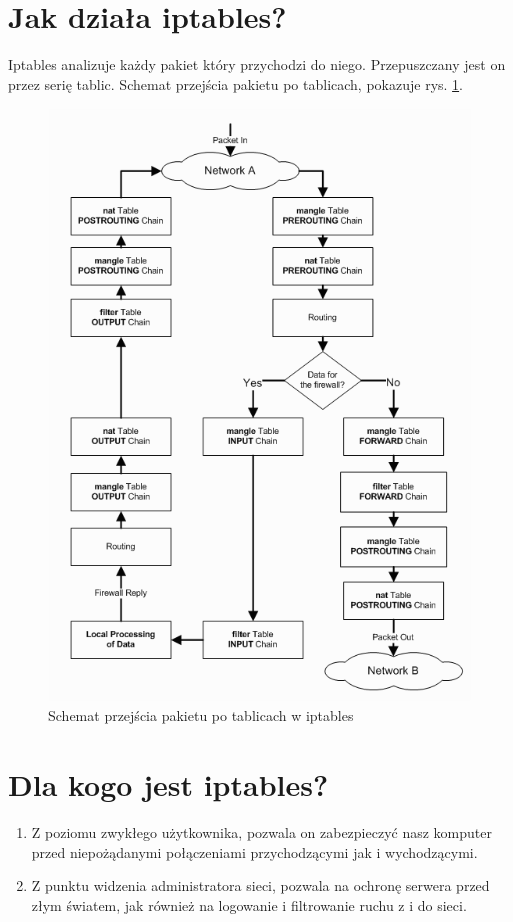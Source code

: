 \documentclass[a4paper,11pt]{article}
\begin{document}
\section{Jak działa iptables?}
Iptables analizuje każdy pakiet który przychodzi do niego. Przepuszczany jest on przez serię tablic. Schemat przejścia pakietu po tablicach, pokazuje rys. \ref{fig:iptables_tablice}.
\begin{figure}
\includegraphics[scale=0.8]{iptables.png}
\caption{Schemat przejścia pakietu po tablicach w iptables}
\label{fig:iptables_tablice}
\end{figure}
\section{Dla kogo jest iptables?}
\begin{enumerate}
\item Z poziomu zwykłego użytkownika, pozwala on zabezpieczyć nasz komputer przed niepożądanymi połączeniami przychodzącymi jak i wychodzącymi.
\item Z punktu widzenia administratora sieci, pozwala na ochronę serwera przed złym światem, jak również na logowanie i filtrowanie ruchu z i do sieci.
\end{enumerate}
\end{document}
